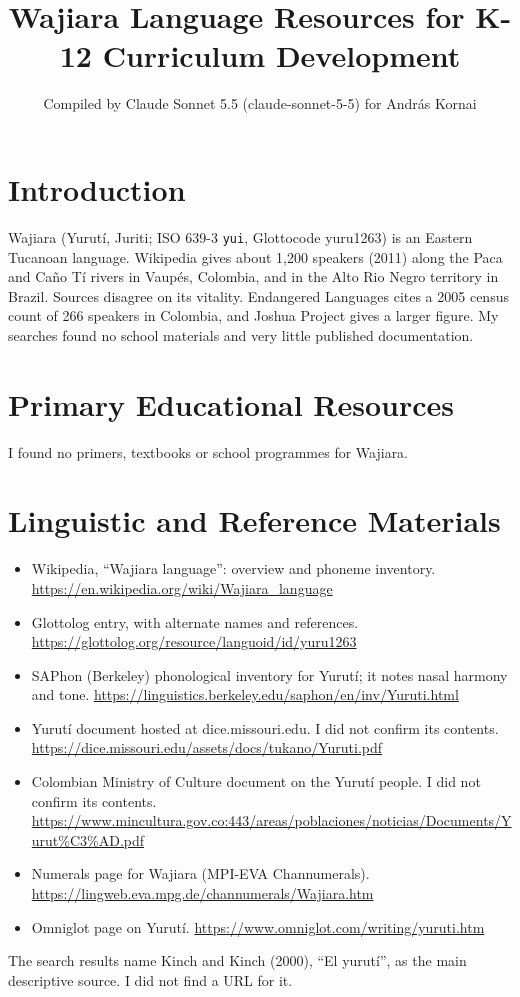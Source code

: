 \documentclass[12pt]{article}
\title{Wajiara Language Resources for K-12 Curriculum Development}
\author{Compiled by Claude Sonnet 5.5 (claude-sonnet-5-5) for Andr\'as Kornai}
\date{}
\begin{document}
\maketitle

\section{Introduction}
Wajiara (Yurut\'i, Juriti; ISO 639-3 \texttt{yui}, Glottocode yuru1263) is an Eastern Tucanoan language. Wikipedia gives about 1,200 speakers (2011) along the Paca and Ca\~no T\'i rivers in Vaup\'es, Colombia, and in the Alto Rio Negro territory in Brazil. Sources disagree on its vitality. Endangered Languages cites a 2005 census count of 266 speakers in Colombia, and Joshua Project gives a larger figure. My searches found no school materials and very little published documentation.

\section{Primary Educational Resources}
I found no primers, textbooks or school programmes for Wajiara.

\section{Linguistic and Reference Materials}
\begin{itemize}
\item Wikipedia, ``Wajiara language'': overview and phoneme inventory. \url{https://en.wikipedia.org/wiki/Wajiara_language}
\item Glottolog entry, with alternate names and references. \url{https://glottolog.org/resource/languoid/id/yuru1263}
\item SAPhon (Berkeley) phonological inventory for Yurut\'i; it notes nasal harmony and tone. \url{https://linguistics.berkeley.edu/saphon/en/inv/Yuruti.html}
\item Yurut\'i document hosted at dice.missouri.edu. I did not confirm its contents. \url{https://dice.missouri.edu/assets/docs/tukano/Yuruti.pdf}
\item Colombian Ministry of Culture document on the Yurut\'i people. I did not confirm its contents. \url{https://www.mincultura.gov.co:443/areas/poblaciones/noticias/Documents/Yurut\%C3\%AD.pdf}
\item Numerals page for Wajiara (MPI-EVA Channumerals). \url{https://lingweb.eva.mpg.de/channumerals/Wajiara.htm}
\item Omniglot page on Yurut\'i. \url{https://www.omniglot.com/writing/yuruti.htm}
\end{itemize}
The search results name Kinch and Kinch (2000), ``El yurut\'i'', as the main descriptive source. I did not find a URL for it.
\end{document}
